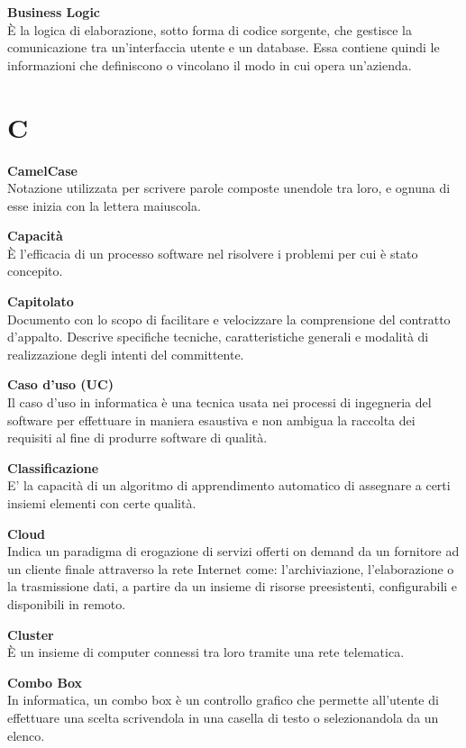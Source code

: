 \documentclass[a4paper, oneside, openany, dvipsnames, table, 12pt]{article}
\begin{document}
\textbf{Business Logic} \\
È la logica di elaborazione, sotto forma di codice sorgente, che gestisce la comunicazione tra un'interfaccia utente e un database.
Essa contiene quindi le informazioni che definiscono o vincolano il modo in cui opera un'azienda.



\newpage
\section{C}
\textbf{CamelCase} \\
Notazione utilizzata per scrivere parole composte unendole tra loro, e ognuna di esse inizia con la lettera maiuscola.

\textbf{Capacità} \\
È l'efficacia di un processo software nel risolvere i problemi per cui è stato concepito.

\textbf{Capitolato}\\	
Documento con lo scopo di facilitare e velocizzare la comprensione del contratto d'appalto. Descrive specifiche tecniche, caratteristiche generali e modalità di realizzazione degli intenti del committente.

\textbf{Caso d'uso (UC)} \\
Il caso d'uso in informatica è una tecnica usata nei processi di ingegneria del software per effettuare in maniera esaustiva e non ambigua la raccolta dei requisiti al fine di produrre software di qualità.

\textbf{Classificazione} \\
 E’ la capacità di un algoritmo di apprendimento automatico di assegnare a certi insiemi elementi con certe qualità.

\textbf{Cloud} \\
Indica un paradigma di erogazione di servizi offerti on demand da un fornitore ad un cliente finale attraverso la rete Internet come: l'archiviazione, l'elaborazione o la trasmissione dati, a partire da un insieme di risorse preesistenti, configurabili e disponibili in remoto.

\textbf{Cluster} \\
È un insieme di computer connessi tra loro tramite una rete telematica.

\textbf{Combo Box} \\
In informatica, un combo box è un controllo grafico che permette all'utente di effettuare una scelta scrivendola in una casella di testo o selezionandola da un elenco. 
\end{document}
